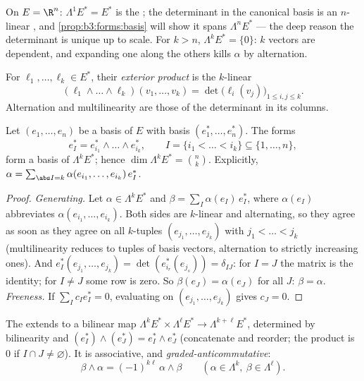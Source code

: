 \begin{example}
On $E = \R^n$: $\Lambda^1E^* = E^*$ is the ; the
determinant in the canonical basis is an $n$-linear
, and \cref{prop:b3:forms:basis} will show it
spans $\Lambda^nE^*$ --- the deep reason the determinant is
unique up to scale. For $k > n$, $\Lambda^kE^* = \{0\}$:
$k$ vectors are dependent, and expanding one along the others
kills $\alpha$ by alternation.
\end{example}

\begin{definition}\label{def:b3:forms:wedge}
For $\ell_1, \dots, \ell_k \in E^*$, their \emph{exterior
product} is the $k$-linear 
\[
(\ell_1 \wedge \dots \wedge \ell_k)(v_1, \dots, v_k)
= \det\bigl(\ell_i(v_j)\bigr)_{1 \leq i, j \leq k} .
\]
Alternation and multilinearity are those of the determinant in
its columns.
\end{definition}

\begin{proposition}\label{prop:b3:forms:basis}
Let $(e_1, \dots, e_n)$ be a basis of $E$ with  basis
$(e_1^*, \dots, e_n^*)$. The forms
\[
e_I^* = e_{i_1}^* \wedge \dots \wedge e_{i_k}^*,
\qquad I = \{i_1 < \dots < i_k\} \subseteq \{1, \dots, n\},
\]
form a basis of $\Lambda^kE^*$; hence $\dim\Lambda^kE^* =
\binom nk$. Explicitly, $\alpha =
\sum_{\abs I = k}\alpha(e_{i_1}, \dots, e_{i_k})\,e_I^*$.
\end{proposition}

\begin{proof}
\emph{Generating.} Let $\alpha \in \Lambda^kE^*$ and $\beta =
\sum_I\alpha(e_I)\,e_I^*$, where $\alpha(e_I)$ abbreviates
$\alpha(e_{i_1}, \dots, e_{i_k})$. Both sides are $k$-linear
and alternating, so they agree as soon as they agree on all
$k$-tuples $(e_{j_1}, \dots, e_{j_k})$ with $j_1 < \dots <
j_k$ (multilinearity reduces to tuples of basis vectors,
alternation to strictly increasing ones). And $e_I^*(e_{j_1},
\dots, e_{j_k}) = \det(e_{i_r}^*(e_{j_s})) = \delta_{IJ}$:
for $I = J$ the matrix is the identity; for $I \neq J$ some
row is zero. So $\beta(e_J) = \alpha(e_J)$ for all $J$:
$\beta = \alpha$. \emph{Freeness.} If $\sum_I c_Ie_I^* = 0$,
evaluating on $(e_{j_1}, \dots, e_{j_k})$ gives $c_J = 0$.
\end{proof}

\begin{definition}\label{def:b3:forms:wedgegeneral}
The  extends to a bilinear map
$\Lambda^kE^* \times \Lambda^\ell E^* \to
\Lambda^{k+\ell}E^*$, determined by bilinearity and
$(e_I^*) \wedge (e_J^*) = e_I^* \wedge e_J^*$ (concatenate
and reorder; the product is $0$ if $I \cap J \neq
\varnothing$). It is associative, and
\emph{graded-anticommutative}:
\[
\beta \wedge \alpha = (-1)^{k\ell}\,\alpha \wedge \beta
\qquad (\alpha \in \Lambda^k, \ \beta \in \Lambda^\ell).
\]
\end{definition}

